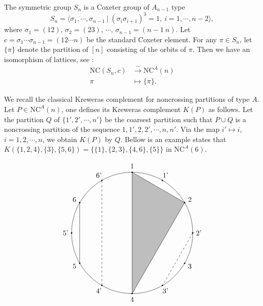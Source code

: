 \documentclass[a4paper, 11pt, reqno]{amsart}
\numberwithin{equation}{section}
\theoremstyle{remark}
\theoremstyle{definition}
\begin{document}
The symmetric group $S_n$ is a Coxeter group of $A_{n-1}$ type
\[
    S_n=\langle \sigma_1, \cdots, \sigma_{n-1} \ | \ (\sigma_{i} \sigma_{i+1})^3=1, \ i=1,\cdots,n-2 \rangle,
\]
where $\sigma_1=(12)$, $\sigma_2=(23)$, $\cdots$, $\sigma_{n-1}=(n-1 \ n)$. Let $c=\sigma_1 \cdots \sigma_{n-1}=(12\cdots n)$ be the standard Coxeter element. For any $\pi \in S_n$, let $\{\pi\}$ denote the partition of $[n]$ consisting of the orbits of $\pi$. Then we have an isomorphism of lattices, see \cite[Theorem 4.1.3]{armstrong2009generalized}:
\begin{align*}
    \mathrm{NC}(S_n,c) &\xrightarrow{\sim} \mathrm{NC}^A(n) \\
    \pi &\mapsto \{ \pi \}.
\end{align*}

We recall the classical Kreweras complement for noncrossing partitions of type $A$. Let $P \in \mathrm{NC}^A(n)$, one defines its Kreweras complement $K(P)$ as follows. Let the partition $Q$ of $\{1',2',\cdots,n' \}$ be the coarsest partition such that $P \cup Q$ is a noncrossing partition of the sequence $1,1',2,2',\cdots,n,n'$. Via the map $i' \mapsto i$, $i=1,2,\cdots,n$, we obtain $K(P)$ by $Q$. Bellow is an example states that $K(\{1,2,4\},\{3\},\{5,6\})=\{\{1\},\{2,3\},\{4,6\},\{5\}\}$ in $\mathrm{NC}^A(6)$. 

\[
\begin{tikzpicture}
\draw (0,0) circle (3);
\node (a) at (90:3.3) {1};
\node (b) at (30:3.3) {2};
\node (c) at (-30:3.3) {3};
\node (d) at (-90:3.3) {4};
\node (e) at (-150:3.3) {5};
\node (f) at (150:3.3) {6};
\node (a') at (60:3.3) {1'};
\node (b') at (0:3.3) {2'};
\node (c') at (-60:3.3) {3'};
\node (d') at (-120:3.3) {4'};
\node (e') at (180:3.3) {5'};
\node (f') at (120:3.3) {6'};

\fill (90:3) circle (1pt);
\fill (30:3) circle (1pt);
\fill (-30:3) circle (1pt);
\fill (-90:3) circle (1pt);
\fill (-150:3) circle (1pt);
\fill (150:3) circle (1pt);
\fill (60:3) circle (1pt);
\fill (0:3) circle (1pt);
\fill (-60:3) circle (1pt);
\fill (-120:3) circle (1pt);
\fill (180:3) circle (1pt);
\fill (120:3) circle (1pt);

\filldraw[fill=gray, fill opacity=0.5] (90:3) to (30:3) to (-90:3) to (90:3);
\draw (150:3) to (-150:3);

\draw[dashed] (0:3) to (-60:3);
\draw[dashed] (-120:3) to (120:3);

\end{tikzpicture}
\]
\end{document}
